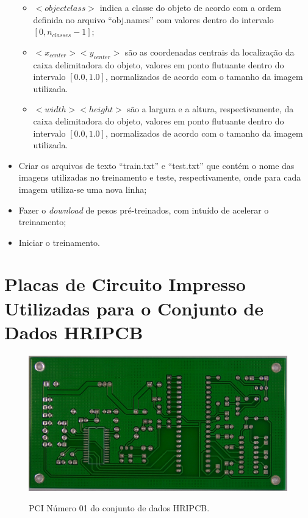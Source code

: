 \begin{itemize}
  \begin{itemize}
    \item $<objectclass>$ indica a classe do objeto de acordo com a ordem definida no arquivo ``obj.names'' com valores dentro do intervalo $[0, n_{classes} - 1]$;
    \item $<x_{center}> <y_{center}>$ são as coordenadas centrais da localização da caixa delimitadora do objeto, valores em ponto flutuante dentro do intervalo $[0.0, 1.0]$, normalizados de acordo com o tamanho da imagem utilizada.
    \item $<width> <height>$ são a largura e a altura, respectivamente, da caixa delimitadora do objeto, valores em ponto flutuante dentro do intervalo $[0.0, 1.0]$, normalizados de acordo com o tamanho da imagem utilizada.
  \end{itemize}
  \item Criar os arquivos de texto ``train.txt'' e ``test.txt'' que contém o nome das imagens utilizadas no treinamento e teste, respectivamente, onde para cada imagem utiliza-se uma nova linha;
  \item Fazer o \textit{download} de pesos pré-treinados, com intuído de acelerar o treinamento;
  \item Iniciar o treinamento.
\end{itemize}


\chapter{Placas de Circuito Impresso Utilizadas para o Conjunto de Dados HRIPCB} \label{apendice:hripcb-pcbs}

\begin{figure}[!h] %
  \centering
  \caption{PCI Número 01 do conjunto de dados HRIPCB.}
  \includegraphics[scale=0.11]{img/pcbs/01.JPG}
  \label{fig:ap-pcbs-1}
\end{figure}

